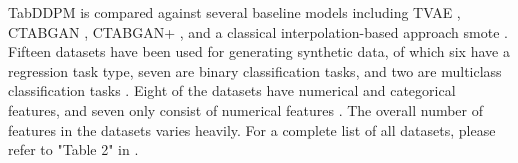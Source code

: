 TabDDPM is compared against several baseline models including TVAE \cite{xu2019ModelingTabularData}, CTABGAN \cite{zhao2021CTABGANEffectiveTablea}, CTABGAN+ \cite{zhao2022CTABGANEnhancingTabular},
and a classical interpolation-based approach \gls{smote} \cite{chawla2002SMOTESyntheticMinority}.
Fifteen datasets have been used for generating synthetic data, of which six have a regression task type, seven are binary classification tasks, and two are multiclass classification tasks \cite{kotelnikov2022TabDDPMModellingTabular}.
Eight of the datasets have numerical and categorical features, and seven only consist of numerical features \cite{kotelnikov2022TabDDPMModellingTabular}.
The overall number of features in the datasets varies heavily. 
For a complete list of all datasets, please refer to "Table 2" in \cite[p. 5]{kotelnikov2022TabDDPMModellingTabular}.

